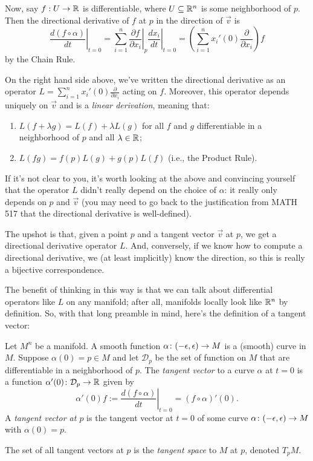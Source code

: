 Now, say $f: U \to \mathbb{R}$ is differentiable, where $U \subseteq \mathbb{R}^n$ is some neighborhood of $p$. Then the directional derivative of $f$ at $p$ in the direction of $\vec{v}$ is 
\[
	\left. \frac{d(f \circ \alpha)}{dt} \right|_{t=0} = \sum_{i=1}^n \left.\frac{\partial f}{\partial x_i}\right|_p \left. \frac{d x_i}{dt} \right|_{t=0} = \left(\sum_{i=1}^n x_i'(0) \frac{\partial}{\partial x_i}\right)f
\]
by the Chain Rule. 

On the right hand side above, we've written the directional derivative as an operator $L = \sum_{i=1}^n x_i'(0) \frac{\partial}{\partial x_i}$ acting on $f$. Moreover, this operator depends uniquely on $\vec{v}$ and is a \emph{linear derivation}, meaning that:
\begin{enumerate}
	\item \label{it:linearity of vector field} $L(f + \lambda g) = L(f) + \lambda L(g)$ for all $f$ and $g$ differentiable in a neighborhood of $p$ and all $\lambda \in \mathbb{R}$;
	\item $L(f g) = f(p) L(g) + g(p) L(f)$ (i.e., the Product Rule).
\end{enumerate}

If it's not clear to you, it's worth looking at the above and convincing yourself that the operator $L$ didn't really depend on the choice of $\alpha$: it really only depends on $p$ and $\vec{v}$ (you may need to go back to the justification from MATH 517 that the directional derivative is well-defined).

The upshot is that, given a point $p$ and a tangent vector $\vec{v}$ at $p$, we get a directional derivative operator $L$. And, conversely, if we know how to compute a directional derivative, we (at least implicitly) know the direction, so this is really a bijective correspondence.

The benefit of thinking in this way is that we can talk about differential operators like $L$ on any manifold; after all, manifolds locally look like $\mathbb{R}^n$ by definition. So, with that long preamble in mind, here's the definition of a tangent vector:

\begin{definition}\label{def:tangent vector}
	Let $M^n$ be a manifold. A smooth function $\alpha\colon\thinspace\! (-\epsilon, \epsilon) \to M$ is a (smooth) curve in $M$. Suppose $\alpha(0) = p \in M$ and let $\mathcal{D}_p$ be the set of function on $M$ that are differentiable in a neighborhood of $p$. The \emph{tangent vector} to a curve $\alpha$ at $t=0$ is a function $\alpha'(0)\colon\thinspace\! \mathcal{D}_p \to \mathbb{R}$ given by
	\[
		\alpha'(0)f := \left. \frac{d(f\circ \alpha)}{dt} \right|_{t=0} = (f\circ \alpha)'(0).
	\] 
	A \emph{tangent vector at $p$} is the tangent vector at $t=0$ of some curve $\alpha\colon\thinspace\! (-\epsilon, \epsilon) \to M$ with $\alpha(0) = p$.
	
	The set of all tangent vectors at $p$ is the \emph{tangent space} to $M$ at $p$, denoted $T_pM$.
\end{definition}

